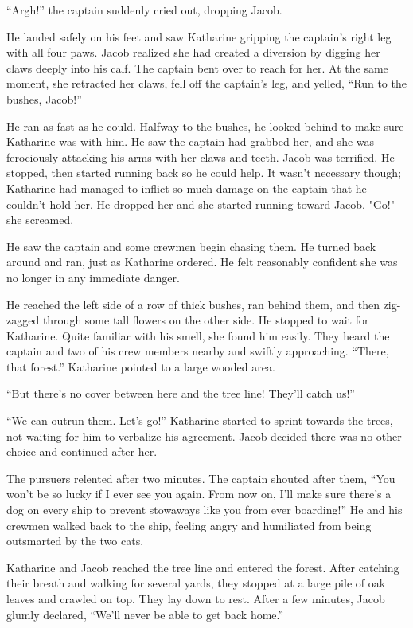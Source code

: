 “Argh!” the captain suddenly cried out, dropping Jacob.

He landed safely on his feet and saw Katharine gripping the captain's right leg with all four paws. Jacob realized she had created a diversion by digging her claws deeply into his calf. The captain bent over to reach for her. At the same moment, she retracted her claws, fell off the captain's leg, and yelled, “Run to the bushes, Jacob!”

He ran as fast as he could. Halfway to the bushes, he looked behind to make sure Katharine was with him. He saw the captain had grabbed her, and she was ferociously attacking his arms with her claws and teeth. Jacob was terrified. He stopped, then started running back so he could help. It wasn't necessary though; Katharine had managed to inflict so much damage on the captain that he couldn't hold her. He dropped her and she started running toward Jacob. "Go!" she screamed.

He saw the captain and some crewmen begin chasing them. He turned back around and ran, just as Katharine ordered. He felt reasonably confident she was no longer in any immediate danger.

He reached the left side of a row of thick bushes, ran behind them, and then zig-zagged through some tall flowers on the other side. He stopped to wait for Katharine. Quite familiar with his smell, she found him easily. They heard the captain and two of his crew members nearby and swiftly approaching. “There, that forest.” Katharine pointed to a large wooded area.

“But there's no cover between here and the tree line! They'll catch us!”

“We can outrun them. Let's go!” Katharine started to sprint towards the trees, not waiting for him to verbalize his agreement. Jacob decided there was no other choice and continued after her.

The pursuers relented after two minutes. The captain shouted after them, “You won't be so lucky if I ever see you again. From now on, I'll make sure there's a dog on every ship to prevent stowaways like you from ever boarding!” He and his crewmen walked back to the ship, feeling angry and humiliated from being outsmarted by the two cats.

\timesep

Katharine and Jacob reached the tree line and entered the forest. After catching their breath and walking for several yards, they stopped at a large pile of oak leaves and crawled on top. They lay down to rest. After a few minutes, Jacob glumly declared, “We'll never be able to get back home.”

